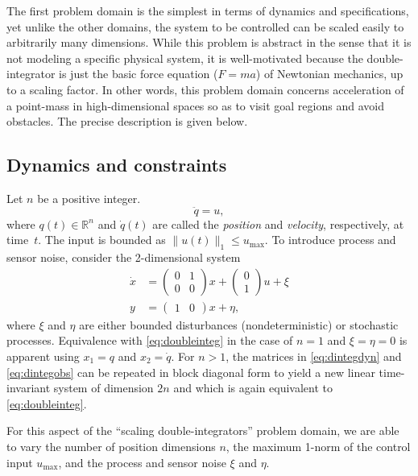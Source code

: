 \documentclass{amsart}
\theoremstyle{definition}
\begin{document}
The first problem domain is the simplest in terms of dynamics and
specifications, yet unlike the other domains, the system to be controlled can be
scaled easily to arbitrarily many dimensions.  While this problem is abstract in
the sense that it is not modeling a specific physical system, it is
well-motivated because the double-integrator is just the basic force equation
($F=ma$) of Newtonian mechanics, up to a scaling factor.  In other words, this
problem domain concerns acceleration of a point-mass in high-dimensional spaces
so as to visit goal regions and avoid obstacles.  The precise description is
given below.

\subsection{Dynamics and constraints}

Let $n$ be a positive integer.
\begin{equation}\label{eq:doubleinteg}
\ddot{q} = u ,
\end{equation}
where $q(t)\in \mathbb{R}^{n}$ and $\dot{q}(t)$ are called the \textit{position}
and \textit{velocity}, respectively, at time~$t$.  The input is bounded as
$\lVert u(t) \rVert_1 \leq u_{\mathrm{max}}$.  To introduce process and sensor
noise, consider the 2-dimensional system
\begin{align}
\dot{x} &= \left(
\begin{array}{cc}
0 & 1 \\
0 & 0
\end{array}
\right) x + \left(
\begin{array}{c}
0 \\
1
\end{array}
\right) u + \xi \label{eq:dintegdyn}\\
y &= \left(
\begin{array}{cc}
1 & 0
\end{array}
\right) x + \eta \label{eq:dintegobs},
\end{align}
where $\xi$ and $\eta$ are either bounded disturbances (nondeterministic) or
stochastic processes.  Equivalence with \eqref{eq:doubleinteg} in the case of
$n=1$ and $\xi=\eta=0$ is apparent using $x_1 = q$ and $x_2 = \dot{q}$.  For $n
> 1$, the matrices in \eqref{eq:dintegdyn} and \eqref{eq:dintegobs} can be
repeated in block diagonal form to yield a new linear time-invariant system of
dimension $2n$ and which is again equivalent to \eqref{eq:doubleinteg}.

For this aspect of the ``scaling double-integrators'' problem domain, we are
able to vary the number of position dimensions $n$, the maximum 1-norm of the
control input $u_{\mathrm{max}}$, and the process and sensor noise $\xi$ and
$\eta$.
\end{document}
